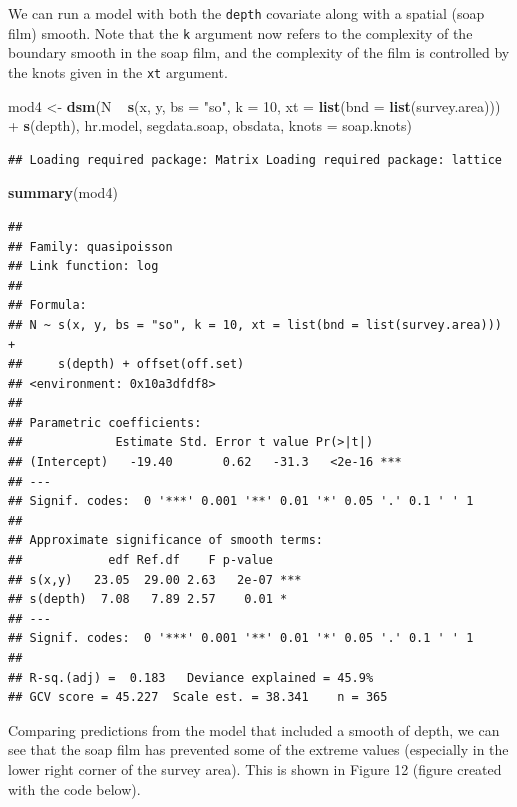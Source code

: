 \documentclass[]{amsart}
\newenvironment{Shaded}{}{}
\newcommand{\KeywordTok}[1]{\textcolor[rgb]{0.00,0.44,0.13}{\textbf{{#1}}}}
\newcommand{\DataTypeTok}[1]{\textcolor[rgb]{0.56,0.13,0.00}{{#1}}}
\newcommand{\DecValTok}[1]{\textcolor[rgb]{0.25,0.63,0.44}{{#1}}}
\newcommand{\StringTok}[1]{\textcolor[rgb]{0.25,0.44,0.63}{{#1}}}
\newcommand{\NormalTok}[1]{{#1}}
\begin{document}
We can run a model with both the \texttt{depth} covariate along with a
spatial (soap film) smooth. Note that the \texttt{k} argument now refers
to the complexity of the boundary smooth in the soap film, and the
complexity of the film is controlled by the knots given in the
\texttt{xt} argument.

\begin{Shaded}
\begin{Highlighting}[]
\NormalTok{mod4 <-}\StringTok{ }\KeywordTok{dsm}\NormalTok{(N ~}\StringTok{ }\KeywordTok{s}\NormalTok{(x, y, }\DataTypeTok{bs =} \StringTok{"so"}\NormalTok{, }\DataTypeTok{k =} \DecValTok{10}\NormalTok{, }\DataTypeTok{xt =} \KeywordTok{list}\NormalTok{(}\DataTypeTok{bnd =} \KeywordTok{list}\NormalTok{(survey.area))) +}\StringTok{ }
\StringTok{    }\KeywordTok{s}\NormalTok{(depth), hr.model, segdata.soap, obsdata, }\DataTypeTok{knots =} \NormalTok{soap.knots)}
\end{Highlighting}
\end{Shaded}

\begin{verbatim}
## Loading required package: Matrix Loading required package: lattice
\end{verbatim}

\begin{Shaded}
\begin{Highlighting}[]
\KeywordTok{summary}\NormalTok{(mod4)}
\end{Highlighting}
\end{Shaded}

\begin{verbatim}
## 
## Family: quasipoisson 
## Link function: log 
## 
## Formula:
## N ~ s(x, y, bs = "so", k = 10, xt = list(bnd = list(survey.area))) + 
##     s(depth) + offset(off.set)
## <environment: 0x10a3dfdf8>
## 
## Parametric coefficients:
##             Estimate Std. Error t value Pr(>|t|)    
## (Intercept)   -19.40       0.62   -31.3   <2e-16 ***
## ---
## Signif. codes:  0 '***' 0.001 '**' 0.01 '*' 0.05 '.' 0.1 ' ' 1
## 
## Approximate significance of smooth terms:
##            edf Ref.df    F p-value    
## s(x,y)   23.05  29.00 2.63   2e-07 ***
## s(depth)  7.08   7.89 2.57    0.01 *  
## ---
## Signif. codes:  0 '***' 0.001 '**' 0.01 '*' 0.05 '.' 0.1 ' ' 1
## 
## R-sq.(adj) =  0.183   Deviance explained = 45.9%
## GCV score = 45.227  Scale est. = 38.341    n = 365
\end{verbatim}

Comparing predictions from the model that included a smooth of depth, we
can see that the soap film has prevented some of the extreme values
(especially in the lower right corner of the survey area). This is shown
in Figure 12 (figure created with the code below).
\end{document}
